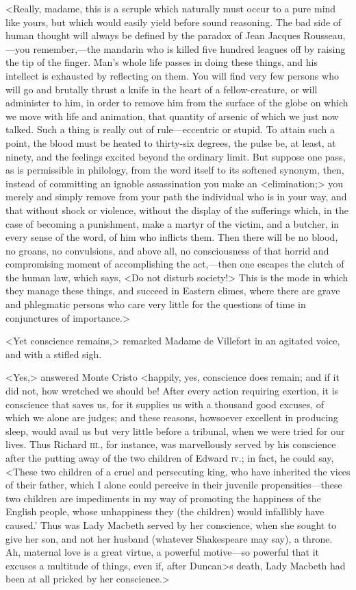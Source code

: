  <Really, madame, this is a scruple which naturally must occur to a pure mind like yours, but which would easily yield before sound reasoning. The bad side of human thought will always be defined by the paradox of Jean Jacques Rousseau,—you remember,—the mandarin who is killed five hundred leagues off by raising the tip of the finger. Man's whole life passes in doing these things, and his intellect is exhausted by reflecting on them. You will find very few persons who will go and brutally thrust a knife in the heart of a fellow-creature, or will administer to him, in order to remove him from the surface of the globe on which we move with life and animation, that quantity of arsenic of which we just now talked. Such a thing is really out of rule—eccentric or stupid. To attain such a point, the blood must be heated to thirty-six degrees, the pulse be, at least, at ninety, and the feelings excited beyond the ordinary limit. But suppose one pass, as is permissible in philology, from the word itself to its softened synonym, then, instead of committing an ignoble assassination you make an <elimination;> you merely and simply remove from your path the individual who is in your way, and that without shock or violence, without the display of the sufferings which, in the case of becoming a punishment, make a martyr of the victim, and a butcher, in every sense of the word, of him who inflicts them. Then there will be no blood, no groans, no convulsions, and above all, no consciousness of that horrid and compromising moment of accomplishing the act,—then one escapes the clutch of the human law, which says, <Do not disturb society!> This is the mode in which they manage these things, and succeed in Eastern climes, where there are grave and phlegmatic persons who care very little for the questions of time in conjunctures of importance.> 

 <Yet conscience remains,> remarked Madame de Villefort in an agitated voice, and with a stifled sigh. 

 <Yes,> answered Monte Cristo <happily, yes, conscience does remain; and if it did not, how wretched we should be! After every action requiring exertion, it is conscience that saves us, for it supplies us with a thousand good excuses, of which we alone are judges; and these reasons, howsoever excellent in producing sleep, would avail us but very little before a tribunal, when we were tried for our lives. Thus Richard \textsc{iii.}, for instance, was marvellously served by his conscience after the putting away of the two children of Edward \textsc{iv.}; in fact, he could say, <These two children of a cruel and persecuting king, who have inherited the vices of their father, which I alone could perceive in their juvenile propensities—these two children are impediments in my way of promoting the happiness of the English people, whose unhappiness they (the children) would infallibly have caused.' Thus was Lady Macbeth served by her conscience, when she sought to give her son, and not her husband (whatever Shakespeare may say), a throne. Ah, maternal love is a great virtue, a powerful motive—so powerful that it excuses a multitude of things, even if, after Duncan>s death, Lady Macbeth had been at all pricked by her conscience.> 

